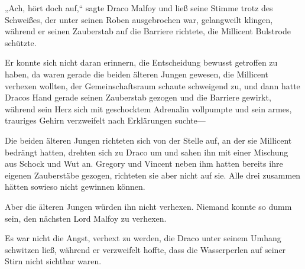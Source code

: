 „Ach, hört doch auf,“ sagte Draco Malfoy und ließ seine Stimme trotz des Schweißes, der unter seinen Roben ausgebrochen war, gelangweilt klingen, während er seinen Zauberstab auf die Barriere richtete, die Millicent Bulstrode schützte.

Er konnte sich nicht daran erinnern, die Entscheidung bewusst getroffen zu haben, da waren gerade die beiden älteren Jungen gewesen, die Millicent verhexen wollten, der Gemeinschaftsraum schaute schweigend zu, und dann hatte Dracos Hand gerade seinen Zauberstab gezogen und die Barriere gewirkt, während sein Herz sich mit geschocktem Adrenalin vollpumpte und sein armes, trauriges Gehirn verzweifelt nach Erklärungen suchte—

Die beiden älteren Jungen richteten sich von der Stelle auf, an der sie Millicent bedrängt hatten, drehten sich zu Draco um und sahen ihn mit einer Mischung aus Schock und Wut an. Gregory und Vincent neben ihm hatten bereits ihre eigenen Zauberstäbe gezogen, richteten sie aber nicht auf sie. Alle drei zusammen hätten sowieso nicht gewinnen können.

Aber die älteren Jungen würden ihn nicht verhexen. Niemand konnte so dumm sein, den nächsten Lord Malfoy zu verhexen.

Es war nicht die Angst, verhext zu werden, die Draco unter seinem Umhang schwitzen ließ, während er verzweifelt hoffte, dass die Wasserperlen auf seiner Stirn nicht sichtbar waren.

